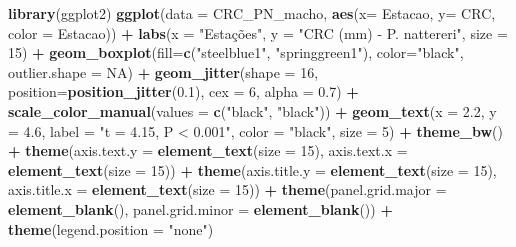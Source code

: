 \documentclass[
]{book}
\newenvironment{Shaded}{\begin{snugshade}}{\end{snugshade}}
\newcommand{\DataTypeTok}[1]{\textcolor[rgb]{0.13,0.29,0.53}{#1}}
\newcommand{\DecValTok}[1]{\textcolor[rgb]{0.00,0.00,0.81}{#1}}
\newcommand{\FloatTok}[1]{\textcolor[rgb]{0.00,0.00,0.81}{#1}}
\newcommand{\KeywordTok}[1]{\textcolor[rgb]{0.13,0.29,0.53}{\textbf{#1}}}
\newcommand{\NormalTok}[1]{#1}
\newcommand{\OperatorTok}[1]{\textcolor[rgb]{0.81,0.36,0.00}{\textbf{#1}}}
\newcommand{\OtherTok}[1]{\textcolor[rgb]{0.56,0.35,0.01}{#1}}
\newcommand{\StringTok}[1]{\textcolor[rgb]{0.31,0.60,0.02}{#1}}
\begin{document}
\begin{Shaded}
\begin{Highlighting}[]
\KeywordTok{library}\NormalTok{(ggplot2)}
\KeywordTok{ggplot}\NormalTok{(}\DataTypeTok{data =}\NormalTok{ CRC_PN_macho, }\KeywordTok{aes}\NormalTok{(}\DataTypeTok{x=}\NormalTok{ Estacao, }\DataTypeTok{y=}\NormalTok{ CRC, }\DataTypeTok{color =}\NormalTok{ Estacao)) }\OperatorTok{+}\StringTok{ }
\StringTok{  }\KeywordTok{labs}\NormalTok{(}\DataTypeTok{x =} \StringTok{"Estações"}\NormalTok{, }\DataTypeTok{y =} \StringTok{"CRC (mm) - P. nattereri"}\NormalTok{, }\DataTypeTok{size =} \DecValTok{15}\NormalTok{) }\OperatorTok{+}
\StringTok{  }\KeywordTok{geom_boxplot}\NormalTok{(}\DataTypeTok{fill=}\KeywordTok{c}\NormalTok{(}\StringTok{"steelblue1"}\NormalTok{, }\StringTok{"springgreen1"}\NormalTok{), }\DataTypeTok{color=}\StringTok{"black"}\NormalTok{, }\DataTypeTok{outlier.shape =} \OtherTok{NA}\NormalTok{) }\OperatorTok{+}
\StringTok{  }\KeywordTok{geom_jitter}\NormalTok{(}\DataTypeTok{shape =} \DecValTok{16}\NormalTok{, }\DataTypeTok{position=}\KeywordTok{position_jitter}\NormalTok{(}\FloatTok{0.1}\NormalTok{), }\DataTypeTok{cex =} \DecValTok{6}\NormalTok{, }\DataTypeTok{alpha =} \FloatTok{0.7}\NormalTok{) }\OperatorTok{+}
\StringTok{  }\KeywordTok{scale_color_manual}\NormalTok{(}\DataTypeTok{values =} \KeywordTok{c}\NormalTok{(}\StringTok{"black"}\NormalTok{, }\StringTok{"black"}\NormalTok{)) }\OperatorTok{+}
\StringTok{  }\KeywordTok{geom_text}\NormalTok{(}\DataTypeTok{x =} \FloatTok{2.2}\NormalTok{, }\DataTypeTok{y =} \FloatTok{4.6}\NormalTok{, }\DataTypeTok{label =} \StringTok{"t = 4.15, P < 0.001"}\NormalTok{, }\DataTypeTok{color =} \StringTok{"black"}\NormalTok{, }\DataTypeTok{size =} \DecValTok{5}\NormalTok{) }\OperatorTok{+}
\StringTok{  }\KeywordTok{theme_bw}\NormalTok{() }\OperatorTok{+}
\StringTok{  }\KeywordTok{theme}\NormalTok{(}\DataTypeTok{axis.text.y =} \KeywordTok{element_text}\NormalTok{(}\DataTypeTok{size =} \DecValTok{15}\NormalTok{), }\DataTypeTok{axis.text.x =} \KeywordTok{element_text}\NormalTok{(}\DataTypeTok{size =} \DecValTok{15}\NormalTok{)) }\OperatorTok{+}
\StringTok{  }\KeywordTok{theme}\NormalTok{(}\DataTypeTok{axis.title.y =} \KeywordTok{element_text}\NormalTok{(}\DataTypeTok{size =} \DecValTok{15}\NormalTok{), }\DataTypeTok{axis.title.x =} \KeywordTok{element_text}\NormalTok{(}\DataTypeTok{size =} \DecValTok{15}\NormalTok{)) }\OperatorTok{+}
\StringTok{  }\KeywordTok{theme}\NormalTok{(}\DataTypeTok{panel.grid.major =} \KeywordTok{element_blank}\NormalTok{(), }\DataTypeTok{panel.grid.minor =} \KeywordTok{element_blank}\NormalTok{()) }\OperatorTok{+}
\StringTok{  }\KeywordTok{theme}\NormalTok{(}\DataTypeTok{legend.position =} \StringTok{"none"}\NormalTok{)}
\end{Highlighting}
\end{Shaded}
\end{document}
